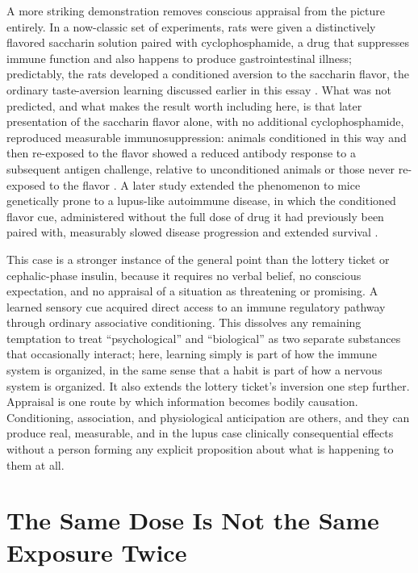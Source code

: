 \documentclass[11pt]{article}
\begin{document}
A more striking demonstration removes conscious appraisal from the picture entirely. In a now-classic set of experiments, rats were given a distinctively flavored saccharin solution paired with cyclophosphamide, a drug that suppresses immune function and also happens to produce gastrointestinal illness; predictably, the rats developed a conditioned aversion to the saccharin flavor, the ordinary taste-aversion learning discussed earlier in this essay \citep{ader1975conditioned}. What was not predicted, and what makes the result worth including here, is that later presentation of the saccharin flavor alone, with no additional cyclophosphamide, reproduced measurable immunosuppression: animals conditioned in this way and then re-exposed to the flavor showed a reduced antibody response to a subsequent antigen challenge, relative to unconditioned animals or those never re-exposed to the flavor \citep{ader1975conditioned}. A later study extended the phenomenon to mice genetically prone to a lupus-like autoimmune disease, in which the conditioned flavor cue, administered without the full dose of drug it had previously been paired with, measurably slowed disease progression and extended survival \citep{ader1982conditioned}.

This case is a stronger instance of the general point than the lottery ticket or cephalic-phase insulin, because it requires no verbal belief, no conscious expectation, and no appraisal of a situation as threatening or promising. A learned sensory cue acquired direct access to an immune regulatory pathway through ordinary associative conditioning. This dissolves any remaining temptation to treat ``psychological'' and ``biological'' as two separate substances that occasionally interact; here, learning simply is part of how the immune system is organized, in the same sense that a habit is part of how a nervous system is organized. It also extends the lottery ticket's inversion one step further. Appraisal is one route by which information becomes bodily causation. Conditioning, association, and physiological anticipation are others, and they can produce real, measurable, and in the lupus case clinically consequential effects without a person forming any explicit proposition about what is happening to them at all.

\section{The Same Dose Is Not the Same Exposure Twice}
\end{document}
